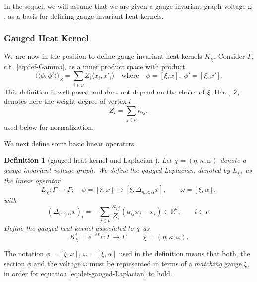\documentclass[10pt,reqno]{amsart}
\numberwithin{equation}{section}
\theoremstyle{bfnote}
\theoremstyle{bfdef}
\newtheorem{definition}[theorem]{Definition}
\newcommand{\la}{\langle}
\newcommand{\ra}{\rangle}
\newcommand{\lla}{\langle\langle}
\newcommand{\rra}{\rangle\rangle}
\newcommand{\R}{\mathbb{R}}
\newcommand{\yyy}{}
\providecommand\x; %
\renewcommand{\x}{x}
\providecommand\gt; %
\renewcommand{\gt}{\xi}
\providecommand\a; %
\renewcommand{\a}{\alpha}
\providecommand\Lpl; %
\renewcommand{\Lpl}{\Delta}
\providecommand\hgen; %
\renewcommand{\hgen}{L}
\providecommand\vg; %
\renewcommand{\vg}{\chi}
\begin{document}
		In the sequel, we will assume that we are given a gauge invariant graph voltage $\omega$, as a basis for defining gauge invariant heat kernels.

	\subsubsection{Gauged Heat Kernel}
		We are now in the position to define gauge invariant heat kernels $K_{\vg}$. Consider $\Gamma$, c.f.~\eqref{eq:def-Gamma}, as a inner product space with product
		\begin{equation}\label{eq:def-bracket-z}
			\lla \phi,\phi' \rra_{Z} = \sum_{i \in \nu} Z_i \la \x_i, x'_i \ra
			\quad \text{where} \quad
			\phi = [\gt,\x ],\; \phi' = [\gt,x'].
		\end{equation}
		This definition is well-posed and does not depend on the choice of $\gt$. Here, $Z_i$ denotes here the weight degree of vertex $i$
		\begin{equation}\label{eq:def-zi}
			Z_{i} = \sum_{j \in \nu} \kappa_{i j},
		\end{equation}
		used below for normalization.

		We next define some basic linear operators.

		\begin{definition}[gauged heat kernel and Laplacian \yyy]\label{def:ginv-k}
			Let $\chi = (\eta,\kappa,\omega)$ denote a gauge invariant voltage graph. We define the \textit{gauged Laplacian}, denoted by  $\hgen_{\vg}$, as the linear operator
			\begin{equation}\label{eq:def-gauged-Laplacian}
				\hgen_{\vg} : \Gamma \to \Gamma; \quad \phi = [\gt,\x ] \mapsto [\gt,\Lpl_{\eta,\kappa,\alpha}x], \qquad \omega = [\gt,\a],
			\end{equation}
			with
			\begin{equation}\label{eq:def-lalpha}
				(\Lpl_{\eta,\kappa,\alpha}x)_i = -\sum_{j \in \nu} \frac{\kappa_{ij}}{Z_i}(\a_{ij} \x_j - \x_i) \in \R^d, \qquad i \in \nu.
			\end{equation}
			Define the \textit{gauged heat kernel} associated to $\chi $ as
			\begin{equation}\label{eq:def-gauged-hk}
				K_{\vg}^t = e^{- t \hgen_{\vg}} : \Gamma \to \Gamma, \qquad \chi =  (\eta,\kappa,\omega).
			\end{equation}
		\end{definition}
		The notation $\phi = [\xi,x]$, $\omega = [\xi,\alpha]$ used in the definition means that both, the section $\phi$ and the voltage $\omega$ must be represented in terms of a \textit{matching} gauge $\xi$, in order for equation \eqref{eq:def-gauged-Laplacian} to hold.
		
\end{document}

